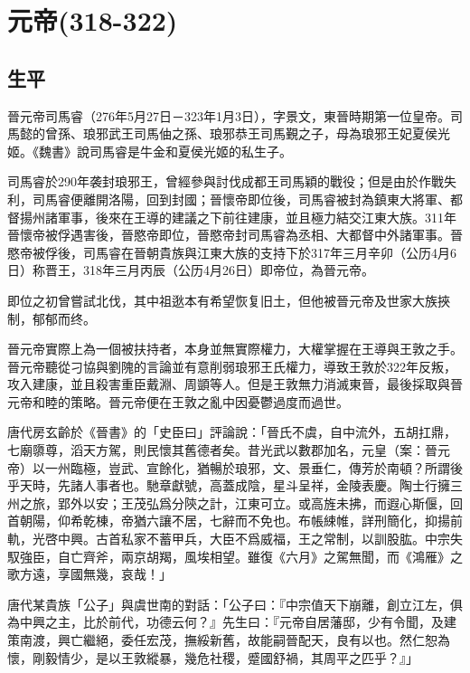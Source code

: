 
\section{元帝\tiny(318-322)}

\subsection{生平}

晉元帝司馬睿（276年5月27日－323年1月3日），字景文，東晉時期第一位皇帝。司馬懿的曾孫、琅邪武王司馬伷之孫、琅邪恭王司馬覲之子，母為琅邪王妃夏侯光姬。《魏書》說司馬睿是牛金和夏侯光姬的私生子。

司馬睿於290年袭封琅邪王，曾經參與討伐成都王司馬穎的戰役；但是由於作戰失利，司馬睿便離開洛陽，回到封國；晉懷帝即位後，司馬睿被封為鎮東大將軍、都督揚州諸軍事，後來在王導的建議之下前往建康，並且極力結交江東大族。311年晉懷帝被俘遇害後，晉愍帝即位，晉愍帝封司馬睿為丞相、大都督中外諸軍事。晉愍帝被俘後，司馬睿在晉朝貴族與江東大族的支持下於317年三月辛卯（公历4月6日）称晋王，318年三月丙辰（公历4月26日）即帝位，為晉元帝。

即位之初曾嘗試北伐，其中祖逖本有希望恢复旧土，但他被晉元帝及世家大族挾制，郁郁而终。

晉元帝實際上為一個被扶持者，本身並無實際權力，大權掌握在王導與王敦之手。晉元帝聽從刁協與劉隗的言論並有意削弱琅邪王氏權力，導致王敦於322年反叛，攻入建康，並且殺害重臣戴淵、周顗等人。但是王敦無力消滅東晉，最後採取與晉元帝和睦的策略。晉元帝便在王敦之亂中因憂鬱過度而過世。

唐代房玄齡於《晉書》的「史臣曰」評論說：「晉氏不虞，自中流外，五胡扛鼎，七廟隳尊，滔天方駕，則民懷其舊德者矣。昔光武以數郡加名，元皇（案：晉元帝）以一州臨極，豈武、宣餘化，猶暢於琅邪，文、景垂仁，傳芳於南頓？所謂後乎天時，先諸人事者也。馳章獻號，高蓋成陰，星斗呈祥，金陵表慶。陶士行擁三州之旅，郢外以安；王茂弘爲分陝之計，江東可立。或高旌未拂，而遐心斯偃，回首朝陽，仰希乾棟，帝猶六讓不居，七辭而不免也。布帳綀帷，詳刑簡化，抑揚前軌，光啓中興。古首私家不蓄甲兵，大臣不爲威福，王之常制，以訓股肱。中宗失馭強臣，自亡齊斧，兩京胡羯，風埃相望。雖復《六月》之駕無聞，而《鴻雁》之歌方遠，享國無幾，哀哉！」

唐代某貴族「公子」與虞世南的對話：「公子曰：『中宗值天下崩離，創立江左，俱為中興之主，比於前代，功德云何？』先生曰：『元帝自居藩邸，少有令聞，及建策南渡，興亡繼絕，委任宏茂，撫綏新舊，故能嗣晉配天，良有以也。然仁恕為懷，剛毅情少，是以王敦縱暴，幾危社稷，蹙國舒禍，其周平之匹乎？』」


